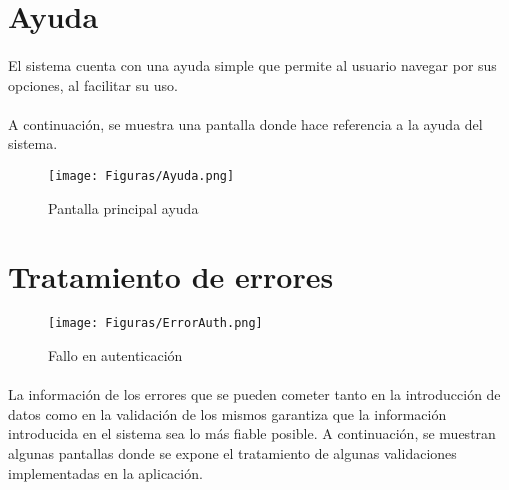 %

\section{Ayuda}
\paragraph{}El sistema cuenta con una ayuda simple que permite al usuario navegar por sus opciones, al facilitar su uso.
\paragraph{}A continuación, se muestra una pantalla donde hace referencia a la ayuda del sistema.

\begin{figure}[H] %
	\centering
	\texttt{[image: Figuras/Ayuda.png]}
	\caption{Pantalla principal ayuda}
	\label{fig:Ayuda}
\end{figure}

\section{Tratamiento de errores}
\begin{figure}[H] %
	\centering
	\texttt{[image: Figuras/ErrorAuth.png]}
	\caption{Fallo en autenticación}
	\label{fig:ErrorAuth}
\end{figure}

\paragraph{}La información de los errores que se pueden cometer tanto en la introducción de datos como en la validación de los mismos garantiza que la información introducida en el sistema sea lo más fiable posible. A continuación, se muestran algunas pantallas donde se expone el tratamiento de algunas validaciones implementadas en la aplicación.
